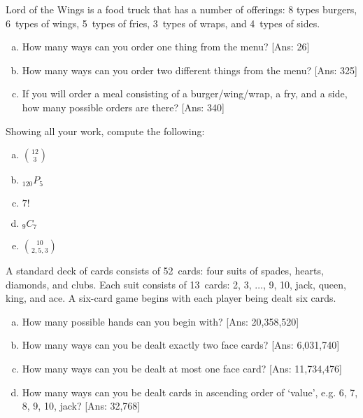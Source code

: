 \documentclass[11pt,letterpaper]{article}
\begin{document}

 Lord of the Wings is a food truck that has a number of offerings: 8 types burgers, 6~types of wings, 5~types of fries, 3~types of wraps, and 4~types of sides. 
	\begin{enumerate}[(a)]
	\item How many ways can you order one thing from the menu? [Ans: 26]
	\item How many ways can you order two different things from the menu? [Ans: 325]
	\item If you will order a meal consisting of a burger/wing/wrap, a fry, and a side, how many possible orders are there? [Ans: 340]
	\end{enumerate}



\newpage



 Showing all your work, compute the following:
	\begin{enumerate}[(a)]
	\item $\binom{12}{3}$
	\item $_{120} P_5$
	\item $7!$
	\item $_{9} C_{7}$
	\item $\binom{10}{2,5,3}$
	\end{enumerate}



\newpage



 A standard deck of cards consists of 52~cards: four suits of spades, hearts, diamonds, and clubs. Each suit consists of 13~cards: 2, 3, $\ldots$, 9, 10, jack, queen, king, and ace. A six-card game begins with each player being dealt six cards. 
	\begin{enumerate}[(a)]
	\item How many possible hands can you begin with? [Ans: 20,358,520]
	\item How many ways can you be dealt exactly two face cards? [Ans: 6,031,740]
	\item How many ways can you be dealt at most one face card? [Ans: 11,734,476]
	\item How many ways can you be dealt cards in ascending order of `value', e.g. 6, 7, 8, 9, 10, jack? [Ans: 32,768]
	\end{enumerate}
\end{document}
